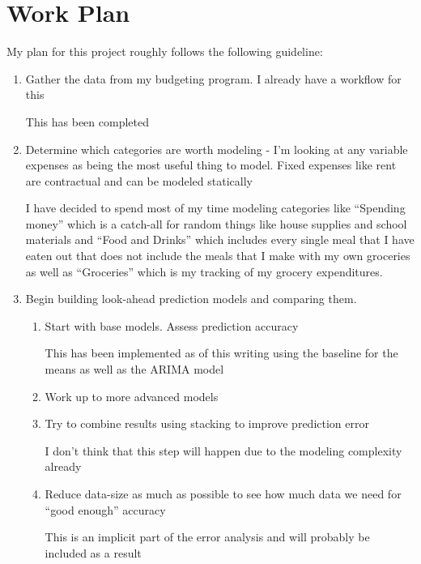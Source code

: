 \documentclass[11pt,a4paper]{article}
\newenvironment{updatematerial}{
\color{blue}
}{

}
\begin{document}
\section{Work Plan}

My plan for this project roughly follows the following guideline:
\begin{enumerate}
	\item Gather the data from my budgeting program. I already have a workflow for this
	\begin{updatematerial}
		This has been completed
	\end{updatematerial}
	\item Determine which categories are worth modeling - I'm looking at any variable expenses as being the most useful thing to model. Fixed expenses like rent are contractual and can be modeled statically
	\begin{updatematerial}
		I have decided to spend most of my time modeling categories like ``Spending money'' which is a catch-all for random things like house supplies and school materials and ``Food and Drinks'' which includes every single meal that I have eaten out that does not include the meals that I make with my own groceries as well as ``Groceries'' which is my tracking of my grocery expenditures.
	\end{updatematerial}
	\item Begin building look-ahead prediction models and comparing them. 
	\begin{enumerate}
		\item Start with base models. Assess prediction accuracy
		\begin{updatematerial}
			This has been implemented as of this writing using the baseline for the means as well as the ARIMA model
		\end{updatematerial}
		\item Work up to more advanced models
		\item Try to combine results using stacking to improve prediction error 
		\begin{updatematerial}
			I don't think that this step will happen due to the modeling complexity already
		\end{updatematerial}
		\item Reduce data-size as much as possible to see how much data we need for ``good enough'' accuracy
		\begin{updatematerial}
			This is an implicit part of the error analysis and will probably be included as a result
		\end{updatematerial}

\end{enumerate}
\end{enumerate}
\end{document}
